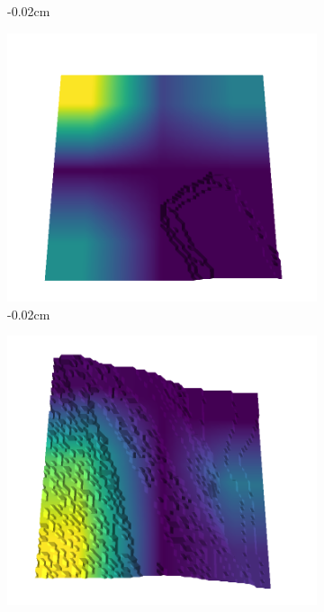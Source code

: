 \documentclass[../document.tex]{subfiles}
\begin{document}
\begin{figure}[H]
\begin{subfigure}[b]{0.242\linewidth}
    \caption{-0.02cm}
    \end{subfigure}
    \begin{subfigure}[b]{0.242\linewidth}
    \includegraphics[width=\linewidth]{../img/5/quarry/worst/05-patch-3d-majavi-colormap-60.png}
    \caption{-0.02cm}
    \end{subfigure}
    \begin{subfigure}[b]{0.242\linewidth}
    \includegraphics[width=\linewidth]{../img/5/quarry/worst/06-patch-3d-majavi-colormap-65.png}

\end{subfigure}
\end{figure}
\end{document}
